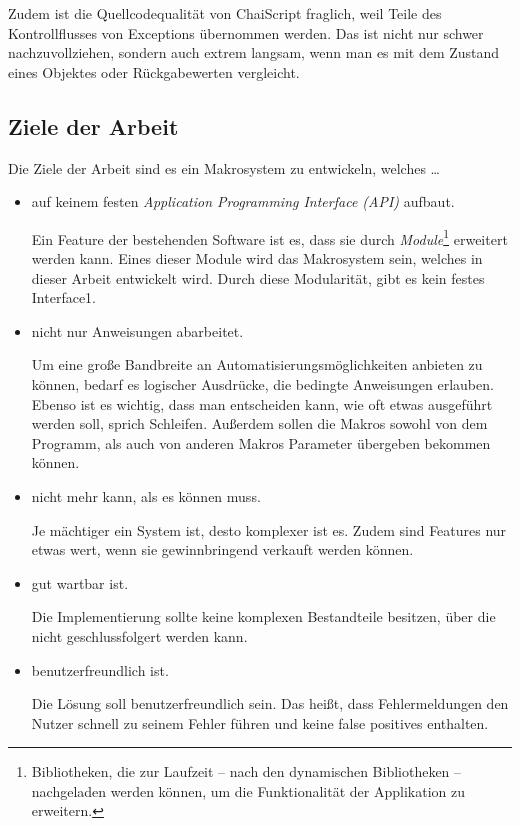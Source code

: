    Zudem ist die Quellcodequalität von ChaiScript fraglich, weil Teile des Kontrollflusses von Exceptions übernommen werden. Das ist nicht nur schwer nachzuvollziehen, sondern auch extrem langsam, wenn man es mit dem Zustand eines Objektes oder Rückgabewerten vergleicht.

  \subsection{Ziele der Arbeit}
  \label{ssec:Ziele der Arbeit}
    Die Ziele der Arbeit sind es ein Makrosystem zu entwickeln, welches \ldots
    \begin{itemize}
      \item auf keinem festen \emph{Application Programming Interface (API)} aufbaut.

        Ein Feature der bestehenden Software ist es, dass sie durch \emph{Module}\footnote{
          Bibliotheken, die zur Laufzeit -- nach den dynamischen Bibliotheken --  nachgeladen werden können, um die Funktionalität der Applikation zu erweitern.
        } erweitert werden kann. Eines dieser Module wird das Makrosystem sein, welches in dieser Arbeit entwickelt wird. Durch diese Modularität, gibt es kein festes Interface1.

      \item nicht nur Anweisungen abarbeitet.

        Um eine große Bandbreite an Automatisierungsmöglichkeiten anbieten zu können, bedarf es logischer Ausdrücke, die bedingte Anweisungen erlauben. Ebenso ist es wichtig, dass man entscheiden kann, wie oft etwas ausgeführt werden soll, sprich Schleifen. Außerdem sollen die Makros sowohl von dem Programm, als auch von anderen Makros Parameter übergeben bekommen können.

      \item nicht mehr kann, als es können muss.

        Je mächtiger ein System ist, desto komplexer ist es. Zudem sind Features nur etwas wert, wenn sie gewinnbringend verkauft werden können.

      \item gut wartbar ist.

        Die Implementierung sollte keine komplexen Bestandteile besitzen, über die nicht geschlussfolgert werden kann.

      \item benutzerfreundlich ist.

        Die Lösung soll benutzerfreundlich sein. Das heißt, dass Fehlermeldungen den Nutzer schnell zu seinem Fehler führen und keine false positives enthalten.
    \end{itemize}

